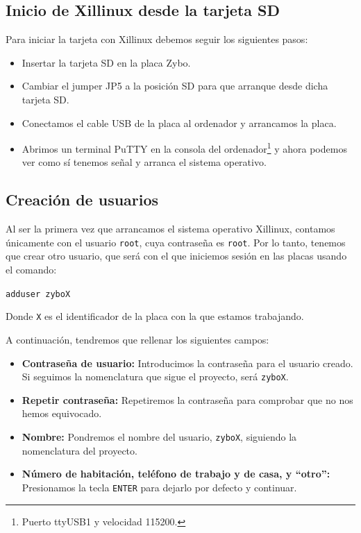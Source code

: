 \subsection{Inicio de Xillinux desde la tarjeta SD}
Para iniciar la tarjeta con Xillinux debemos seguir los siguientes pasos:
\begin{itemize}
	\item Insertar la tarjeta SD en la placa Zybo.
	\item Cambiar el jumper JP5 a la posición SD para que arranque desde dicha tarjeta SD.
	\item Conectamos el cable USB de la placa al ordenador y arrancamos la placa.
	\item Abrimos un terminal PuTTY en la consola del ordenador\footnote{Puerto ttyUSB1 y velocidad 115200.} y ahora podemos ver como sí tenemos señal y arranca el sistema operativo.
\end{itemize}

\newpage
\subsection{Creación de usuarios}
Al ser la primera vez que arrancamos el sistema operativo Xillinux, contamos únicamente con el usuario \texttt{root}, cuya contraseña es \texttt{root}. Por lo tanto, tenemos que crear otro usuario, que será con el que iniciemos sesión en las placas usando el comando:
\begin{center}
	\texttt{adduser zyboX}
\end{center}
Donde \texttt{X} es el identificador de la placa con la que estamos trabajando.

A continuación, tendremos que rellenar los siguientes campos:
\begin{itemize}
	\item \textbf{Contraseña de usuario:} Introducimos la contraseña para el usuario creado. Si seguimos la nomenclatura que sigue el proyecto, será \texttt{zyboX}.
	\item \textbf{Repetir contraseña:} Repetiremos la contraseña para comprobar que no nos hemos equivocado.
	\item \textbf{Nombre:} Pondremos el nombre del usuario, \texttt{zyboX}, siguiendo la nomenclatura del proyecto.
	\item \textbf{Número de habitación, teléfono de trabajo y de casa, y ``otro'':} Presionamos la tecla \texttt{ENTER} para dejarlo por defecto y continuar.
\end{itemize}

